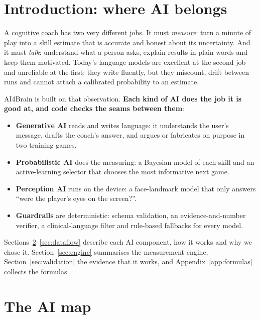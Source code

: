 \documentclass[11pt,a4paper]{article}
\newcommand{\aitag}[2]{{\color{#1}\textbf{#2}}}
\begin{document}
\setcounter{tocdepth}{2}
\tableofcontents
\newpage

\section{Introduction: where AI belongs}

A cognitive coach has two very different jobs. It must \emph{measure}: turn a minute of play into a skill estimate that is accurate and honest about its uncertainty. And it must \emph{talk}: understand what a person asks, explain results in plain words and keep them motivated. Today's language models are excellent at the second job and unreliable at the first: they write fluently, but they miscount, drift between runs and cannot attach a calibrated probability to an estimate.

AI4Brain is built on that observation. \textbf{Each kind of AI does the job it is good at, and code checks the seams between them}:
\begin{itemize}
\item \aitag{gen}{Generative AI} reads and writes language: it understands the user's message, drafts the coach's answer, and argues or fabricates on purpose in two training games.
\item \aitag{prob}{Probabilistic AI} does the measuring: a Bayesian model of each skill and an active-learning selector that chooses the most informative next game.
\ifcamera\item \aitag{per}{Perception AI} runs on the device: a face-landmark model that only answers ``were the player's eyes on the screen?''.\fi
\item \aitag{guard}{Guardrails} are deterministic: schema validation, an evidence-and-number verifier, a clinical-language filter and rule-based fallbacks for every model.
\end{itemize}
Sections~\ref{sec:map}--\ref{sec:dataflow} describe each AI component, how it works and why we chose it. Section~\ref{sec:engine} summarises the measurement engine, Section~\ref{sec:validation} the evidence that it works, and Appendix~\ref{app:formulas} collects the formulas.

\section{The AI map}
\label{sec:map}
\end{document}
